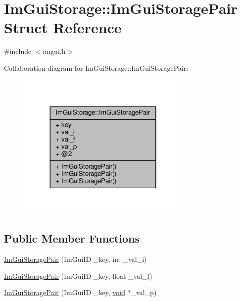 \hypertarget{structImGuiStorage_1_1ImGuiStoragePair}{}\section{Im\+Gui\+Storage\+:\+:Im\+Gui\+Storage\+Pair Struct Reference}
\label{structImGuiStorage_1_1ImGuiStoragePair}


{\ttfamily \#include $<$imgui.\+h$>$}



Collaboration diagram for Im\+Gui\+Storage\+:\+:Im\+Gui\+Storage\+Pair\+:
\nopagebreak
\begin{figure}[H]
\begin{center}
\leavevmode
\includegraphics[width=240pt]{structImGuiStorage_1_1ImGuiStoragePair__coll__graph}
\end{center}
\end{figure}
\subsection*{Public Member Functions}
\begin{DoxyCompactItemize}
\item 
\hyperlink{structImGuiStorage_1_1ImGuiStoragePair_a8e8914f5b7b84d159ed26ff91881282d}{Im\+Gui\+Storage\+Pair} (Im\+Gui\+ID \+\_\+key, int \+\_\+val\+\_\+i)
\item 
\hyperlink{structImGuiStorage_1_1ImGuiStoragePair_abbbe1e675db68f58be3dd5117bd9731b}{Im\+Gui\+Storage\+Pair} (Im\+Gui\+ID \+\_\+key, float \+\_\+val\+\_\+f)
\item 
\hyperlink{structImGuiStorage_1_1ImGuiStoragePair_a20df144db4c75ceceaa69d55d12da412}{Im\+Gui\+Storage\+Pair} (Im\+Gui\+ID \+\_\+key, \hyperlink{imgui__impl__opengl3__loader_8h_ac668e7cffd9e2e9cfee428b9b2f34fa7}{void} $\ast$\+\_\+val\+\_\+p)
\end{DoxyCompactItemize}
